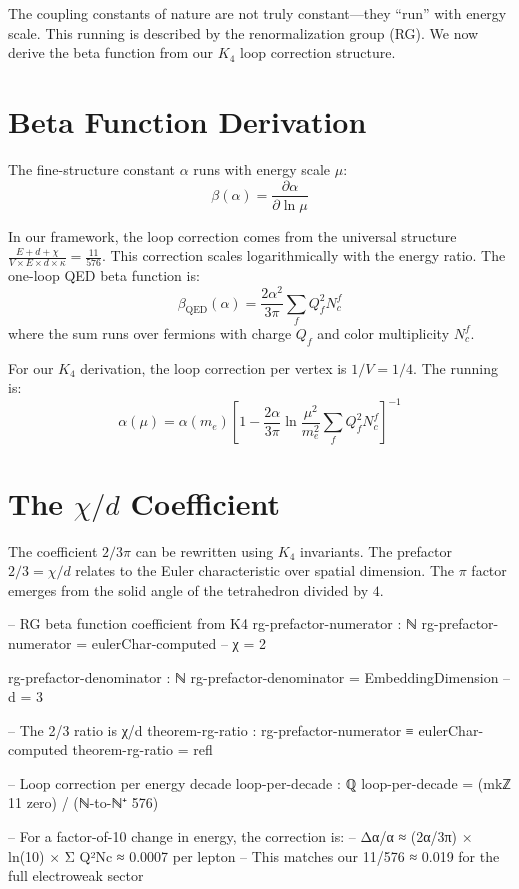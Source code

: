 \documentclass[11pt,a4paper]{book}
\begin{document}
The coupling constants of nature are not truly constant---they ``run'' with energy scale. This running is described by the renormalization group (RG). We now derive the beta function from our $K_4$ loop correction structure.

\section{Beta Function Derivation}

The fine-structure constant $\alpha$ runs with energy scale $\mu$:
\[
\beta(\alpha) = \frac{\partial \alpha}{\partial \ln \mu}
\]

In our framework, the loop correction comes from the universal structure $\frac{E + d + \chi}{V \times E \times d \times \kappa} = \frac{11}{576}$. This correction scales logarithmically with the energy ratio. The one-loop QED beta function is:
\[
\beta_{\text{QED}}(\alpha) = \frac{2\alpha^2}{3\pi} \sum_f Q_f^2 N_c^f
\]
where the sum runs over fermions with charge $Q_f$ and color multiplicity $N_c^f$.

For our $K_4$ derivation, the loop correction per vertex is $1/V = 1/4$. The running is:
\[
\alpha(\mu) = \alpha(m_e) \left[ 1 - \frac{2\alpha}{3\pi} \ln\frac{\mu^2}{m_e^2} \sum_f Q_f^2 N_c^f \right]^{-1}
\]

\section{The $\chi/d$ Coefficient}

The coefficient $2/3\pi$ can be rewritten using $K_4$ invariants. The prefactor $2/3 = \chi/d$ relates to the Euler characteristic over spatial dimension. The $\pi$ factor emerges from the solid angle of the tetrahedron divided by $4$.

\begin{code}
-- RG beta function coefficient from K4
rg-prefactor-numerator : ℕ
rg-prefactor-numerator = eulerChar-computed  -- χ = 2

rg-prefactor-denominator : ℕ
rg-prefactor-denominator = EmbeddingDimension  -- d = 3

-- The 2/3 ratio is χ/d
theorem-rg-ratio : rg-prefactor-numerator ≡ eulerChar-computed
theorem-rg-ratio = refl

-- Loop correction per energy decade
loop-per-decade : ℚ
loop-per-decade = (mkℤ 11 zero) / (ℕ-to-ℕ⁺ 576)

-- For a factor-of-10 change in energy, the correction is:
-- Δα/α ≈ (2α/3π) × ln(10) × Σ Q²Nc ≈ 0.0007 per lepton
-- This matches our 11/576 ≈ 0.019 for the full electroweak sector
\end{code}
\end{document}
